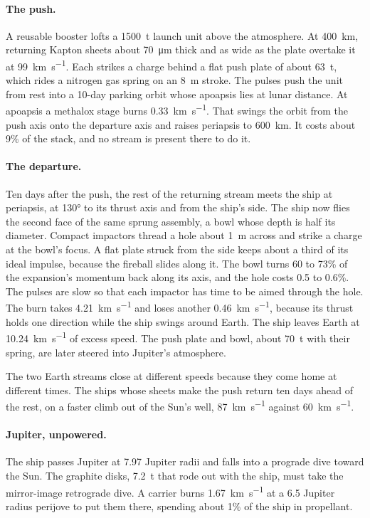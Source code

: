 \documentclass{article}
\begin{document}
\paragraph{The push.} A reusable booster lofts a \SI{1500}{\tonne} launch unit above the atmosphere. At \SI{400}{\kilo\meter}, returning Kapton sheets about \SI{70}{\micro\meter} thick and as wide as the plate overtake it at \SI{99}{\kilo\meter\per\second}. Each strikes a charge behind a flat push plate of about \SI{63}{\tonne}, which rides a nitrogen gas spring on an \SI{8}{\meter} stroke. The pulses push the unit from rest into a 10-day parking orbit whose apoapsis lies at lunar distance. At apoapsis a methalox stage burns \SI{0.33}{\kilo\meter\per\second}. That swings the orbit from the push axis onto the departure axis and raises periapsis to \SI{600}{\kilo\meter}. It costs about 9\% of the stack, and no stream is present there to do it.

\paragraph{The departure.} Ten days after the push, the rest of the returning stream meets the ship at periapsis, at \ang{130} to its thrust axis and from the ship's side. The ship now flies the second face of the same sprung assembly, a bowl whose depth is half its diameter. Compact impactors thread a hole about \SI{1}{\meter} across and strike a charge at the bowl's focus. A flat plate struck from the side keeps about a third of its ideal impulse, because the fireball slides along it. The bowl turns 60 to 73\% of the expansion's momentum back along its axis, and the hole costs 0.5 to 0.6\%. The pulses are slow so that each impactor has time to be aimed through the hole. The burn takes \SI{4.21}{\kilo\meter\per\second} and loses another \SI{0.46}{\kilo\meter\per\second}, because its thrust holds one direction while the ship swings around Earth. The ship leaves Earth at \SI{10.24}{\kilo\meter\per\second} of excess speed. The push plate and bowl, about \SI{70}{\tonne} with their spring, are later steered into Jupiter's atmosphere.

The two Earth streams close at different speeds because they come home at different times. The ships whose sheets make the push return ten days ahead of the rest, on a faster climb out of the Sun's well, \SI{87}{\kilo\meter\per\second} against \SI{60}{\kilo\meter\per\second}.

\paragraph{Jupiter, unpowered.} The ship passes Jupiter at 7.97 Jupiter radii and falls into a prograde dive toward the Sun. The graphite disks, \SI{7.2}{\tonne} that rode out with the ship, must take the mirror-image retrograde dive. A carrier burns \SI{1.67}{\kilo\meter\per\second} at a 6.5 Jupiter radius perijove to put them there, spending about 1\% of the ship in propellant.
\end{document}
